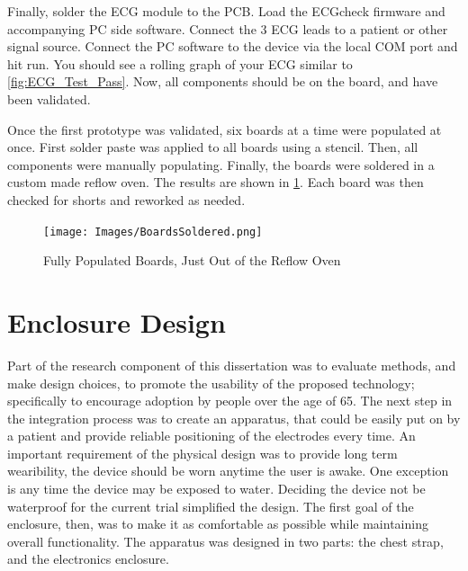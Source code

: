 Finally, solder the ECG module to the PCB. Load the ECGcheck firmware and accompanying PC side software. Connect the 3 ECG leads to a patient or other signal source. Connect the PC software to the device via the local COM port and hit run. You should see a rolling graph of your ECG similar to \cref{fig:ECG_Test_Pass}. Now, all components should be on the board, and have been validated.


Once the first prototype was validated, six boards at a time were populated at once. First solder paste was applied to all boards using a stencil. Then, all components were manually populating. Finally, the boards were soldered in a custom made reflow oven. The results are shown in \cref{fig:ReflowedBoards}. Each board was then checked for shorts and reworked as needed.

\begin{figure}[ht]
\begin{center}
	\label{fig:ReflowedBoards}
	\texttt{[image: Images/BoardsSoldered.png]} 
	\caption{Fully Populated Boards, Just Out of the Reflow Oven}
\end{center}
\end{figure}


\section {Enclosure Design}
\label{sec:EnclosureDesign}
Part of the research component of this dissertation was to evaluate methods, and make design choices, to promote the usability of the  proposed technology; specifically to encourage adoption by people over the age of 65. The next step in the integration process was to create an apparatus, that could be easily put on by a patient and provide reliable positioning of the electrodes every time. An important requirement of the physical design was to provide long term wearibility, the device should be worn anytime the user is awake. One exception is any time the device may be exposed to water. Deciding the device not be waterproof for the current trial simplified the design. The first goal of the enclosure, then, was to make it as comfortable as possible while maintaining overall functionality. The apparatus was designed in two parts: the chest strap, and the electronics enclosure. 




